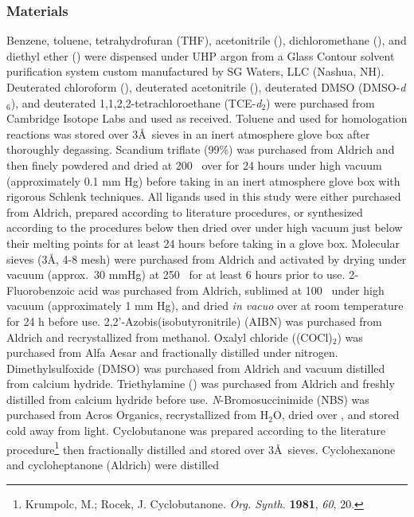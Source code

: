 \subsubsection{Materials}
Benzene, toluene, tetrahydrofuran (THF), acetonitrile (), dichloromethane (),
and diethyl ether () were dispensed under UHP argon from a Glass Contour solvent
purification system custom manufactured by SG Waters, LLC (Nashua, NH). Deuterated chloroform
(), deuterated acetonitrile (), deuterated DMSO (DMSO-\textit{d}$_6$), and
deuterated 1,1,2,2-tetrachloroethane (TCE-\textit{d}$_2$) were purchased from Cambridge Isotope
Labs and used as received. 
Toluene and  used for homologation reactions was stored over 3\AA\  sieves in an inert
atmosphere glove box after thoroughly degassing. Scandium triflate (99\%) was purchased from Aldrich
and then finely powdered and dried at 200 \degc\  over  for 24 hours under high vacuum
(approximately 0.1 mm Hg) before taking in an inert atmosphere glove box with rigorous Schlenk
techniques.
All ligands used in this study were either purchased from Aldrich, prepared according to literature procedures, or synthesized
 according to the procedures below then dried over  under high vacuum just below their
 melting points for at least 24 hours before taking in a glove box. Molecular sieves (3\AA, 4-8
 mesh) were purchased from Aldrich and activated by drying under vacuum (approx.~30 mmHg) at 250
 \degc\ for at least 6 hours prior to use.
2-Fluorobenzoic acid was purchased from Aldrich, sublimed at 100 \degc\  under high vacuum
(approximately 1 mm Hg), and dried \textit{in vacuo} over  at room temperature for 24 h
before use. 2,2'-Azobis(isobutyronitrile) (AIBN) was purchased from Aldrich and recrystallized from
methanol. Oxalyl chloride ((COCl)$_2$) was purchased from Alfa Aesar and fractionally distilled
under nitrogen. Dimethylsulfoxide (DMSO) was purchased from Aldrich and vacuum distilled from calcium
hydride. Triethylamine () was purchased from Aldrich and freshly distilled from calcium
hydride before use. \textit{N}-Bromosuccinimide (NBS) was purchased from Acros Organics,
recrystallized from H$_2$O, dried over , and stored cold away from light. Cyclobutanone was prepared according to the literature procedure\footnote{{\frenchspacing Krumpolc,
M.; Rocek, J. Cyclobutanone. \textit{Org. Synth.} \textbf{1981}, \textit{60}, 20.}} then fractionally distilled and stored over 3\AA\  sieves. Cyclohexanone and cycloheptanone (Aldrich) were distilled

